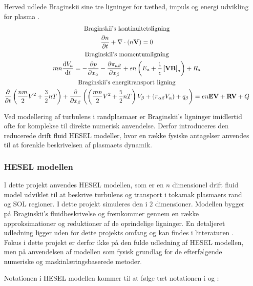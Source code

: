 Herved udlede Braginskii sine tre ligninger for tæthed, impuls og energi udvikling for plasma \cite{braginskii1965}. 
\begin{gather}
    \text{Braginskii's kontinuitetsligning}\notag \\
    \frac{\partial n}{\partial t} + \nabla \cdot (n \mathbf{V}) = 0 \label{eq:Braginskii's kontinuitetsligning}\\
    \text{Braginskii's momentumligning}\notag \\
    mn\frac{\mathrm{d}V_a}{\mathrm{d}t} = - \frac{\partial p}{\partial x_a} - \frac{\partial \pi_{a\beta}}{\partial x_\beta}
    + en\left(E_a + \frac{1}{c} \left[\mathbf{VB}\right]_a\right) + R_a \label{eq:Braginskii's momentum ligning}\\
    \text{Braginskii's energitransport ligning}\notag \\
    \frac{\partial}{\partial t}\left(\frac{nm}{2}  V^2 + \frac{3}{2} n T\right) +
    \frac{\partial}{\partial x_\beta} \left( \left(\frac{mn}{2}V^2  +\frac{5}{2} nT\right)V_\beta +
    \left(\pi_{\alpha \beta} V_\alpha \right) + q_\beta \right) = en\mathbf{EV} + \mathbf{RV} + Q \label{eq:Braginskii's energitransport ligning}
\end{gather}

Ved modellering af turbulens i randplasmaer er Braginskii's ligninger imidlertid ofte for komplekse til direkte numerisk anvendelse.
Derfor introduceres den reducerede drift fluid HESEL modeller, hvor en række fysiske antagelser anvendes til at forenkle beskrivelsen af plasmaets dynamik.

\subsubsection{HESEL modellen}
I dette projekt anvendes HESEL modellen, som er en $n$ dimensionel drift fluid model udviklet til at beskrive turbulens
og transport i tokamak plasmaers rand og SOL regioner. I dette projekt simuleres den i 2 dimensioner.
Modellen bygger på Braginskii's fluidbeskrivelse og fremkommer gennem en række approksimationer og reduktioner af de oprindelige ligninger.
En detaljeret udledning ligger uden for dette projekts omfang og kan findes i litteraturen \cite{udledning_af_hesel}.
Fokus i dette projekt er derfor ikke på den fulde udledning af HESEL modellen, men på anvendelsen af modellen
som fysisk grundlag for de efterfølgende numeriske og maskinlæringsbaserede metoder.

Notationen i HESEL modellen kommer til at følge tæt notationen i \cite{num_sim_blobs} og \cite{plasma_particle_sources}:

